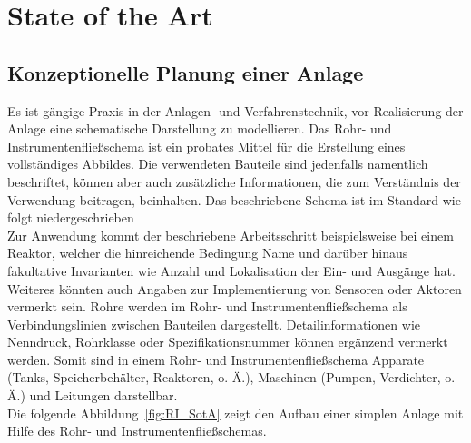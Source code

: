 
\chapter{State of the Art} \label{chapter:stateoftheart}


	\section{Konzeptionelle Planung einer Anlage}
	Es ist gängige Praxis in der Anlagen- und Verfahrenstechnik, vor Realisierung der Anlage eine schematische Darstellung zu modellieren. Das Rohr- und Instrumentenfließschema ist ein probates Mittel für die Erstellung eines vollständiges Abbildes. Die verwendeten Bauteile sind jedenfalls namentlich beschriftet, können aber auch zusätzliche Informationen, die zum Verständnis der Verwendung beitragen, beinhalten. Das beschriebene Schema ist im Standard  wie folgt niedergeschrieben \\
	
	Zur Anwendung kommt der beschriebene Arbeitsschritt beispielsweise bei einem Reaktor, welcher die hinreichende Bedingung \glqq Name \grqq \space und darüber hinaus fakultative Invarianten wie Anzahl und Lokalisation der Ein- und Ausgänge hat. Weiteres könnten auch Angaben zur Implementierung von Sensoren oder Aktoren vermerkt sein. Rohre werden im Rohr- und Instrumentenfließschema als Verbindungslinien zwischen Bauteilen dargestellt. Detailinformationen wie Nenndruck, Rohrklasse oder Spezifikationsnummer können ergänzend vermerkt werden. Somit sind in einem Rohr- und Instrumentenfließschema Apparate (Tanks, Speicherbehälter, Reaktoren, o. Ä.), Maschinen (Pumpen, Verdichter, o. Ä.) und Leitungen darstellbar.\\
	
	Die folgende Abbildung~\ref{fig:RI_SotA} zeigt den Aufbau einer simplen Anlage mit Hilfe des Rohr- und Instrumentenfließschemas.\\

